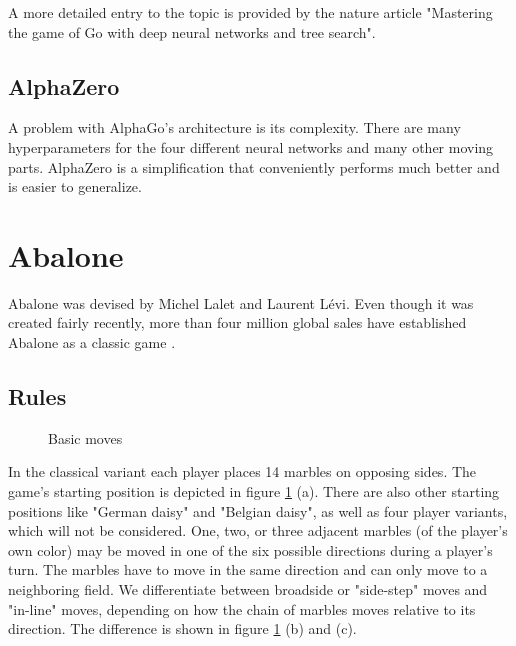 A more detailed entry to the topic is provided by the nature article "Mastering the game of Go with deep neural networks and tree search". \cite{silver_mastering_2016}

\subsection{AlphaZero}
A problem with AlphaGo's architecture is its complexity. There are many hyperparameters for the four different neural networks and many other moving parts. AlphaZero is a simplification that conveniently performs much better and is easier to generalize.

\section{Abalone}
Abalone was devised by Michel Lalet and Laurent Lévi. Even though it was created fairly recently, more than four million global sales have established Abalone as a classic game \cite{noauthor_abalone_2020}.

\subsection{Rules}

\begin{figure}[!h]
    \centering
    \hfill
    \hfill
    \caption{Basic moves \cite{abalone_sa_abalone_nodate}}
    \label{basics}
\end{figure}

In the classical variant each player places 14 marbles on opposing sides. The game's starting position is depicted in figure \ref{basics} (a). There are also other starting positions like "German daisy" and "Belgian daisy", as well as four player variants, which will not be considered. One, two, or three adjacent marbles (of the player's own color) may be moved in one of the six possible directions during a player's turn. The marbles have to move in the same direction and can only move to a neighboring field. We differentiate between broadside or "side-step" moves and "in-line" moves, depending on how the chain of marbles moves relative to its direction. The difference is shown in figure \ref{basics} (b) and (c).

